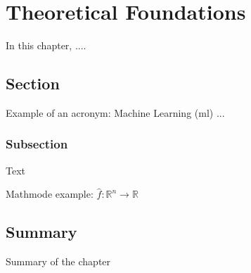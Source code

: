 \chapter{Theoretical Foundations}
\label{chap:chap1}


In this chapter, .... 

\section{Section}

Example of an acronym: Machine Learning (\acrshort{ml}) ...

\subsection{Subsection} 

Text

Mathmode example: $ \hat{f} : \mathbb{R}^n \longrightarrow \mathbb{R} $

\section{Summary}

Summary of the chapter